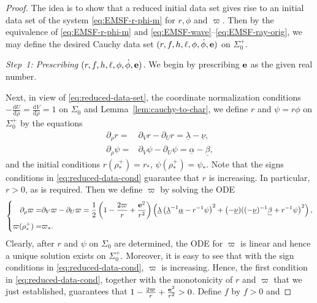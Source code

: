 \documentclass[10pt, reqno]{amsart}
\theoremstyle{definition}
\theoremstyle{remark}
\theoremstyle{conjecture}
\numberwithin{equation}{section}
\newcommand{\ud}{\mathrm{d}}
\newcommand{\rd}{\partial}
\newcommand{\0}{\emptyset}
\newcommand{\alp}{\alpha}
\newcommand{\bt}{\beta}
\newcommand{\lmb}{\lambda}
\newcommand{\Sgm}{\Sigma}
\newcommand{\bfe}{{\bf e}}
\newcommand{\dur}{\nu}
\newcommand{\dvr}{\lmb}
\newcommand{\pfstep}[1]{\vspace{.5em} {\it \noindent #1.}}
\newcommand{\e}{\bfe}							%
\begin{document}
\begin{proof}
The idea is to show that a reduced initial data set gives rise to an initial data set of the system \eqref{eq:EMSF-r-phi-m} for $r, \phi$ and $\varpi$. Then by the equivalence of \eqref{eq:EMSF-r-phi-m} and \eqref{eq:EMSF-wave}--\eqref{eq:EMSF-ray-orig}, we may define the desired Cauchy data set $(r, f, h, \ell, \phi, \dot{\phi}, \e)$ on $\Sgm_{0}^{+}$.

\pfstep{Step~1: Prescribing $(r, f, h, \ell, \phi, \dot{\phi}, \e)$} We begin by prescribing $\e$ as the given real number.


Next, in view of \eqref{eq:reduced-data-set}, the coordinate normalization conditions $- \frac{\ud U}{\ud \rho} = \frac{\ud V}{\ud \rho} = 1$ on $\Sgm_{0}$ and Lemma~\ref{lem:cauchy-to-char}, we define $r$ and $\psi = r \phi$ on $\Sgm_{0}^{+}$ by the equations
\begin{align}
	\rd_{\rho} r
	= & \rd_{V} r - \rd_{U} r = \underline{\dvr} - \underline{\dur} , \label{eq:reduced-data:r}\\
	\rd_{\rho} \psi
	= & \rd_{V} \psi - \rd_{U} \psi = \underline{\alp} - \underline{\bt} \label{eq:reduced-data:psi}, 
\end{align}
and the initial conditions $r(\rho^{+}_{\ast}) = r_{\ast}$, $\psi(\rho^{+}_{\ast}) = \psi_{\ast}$. Note that the signs conditions in \eqref{eq:reduced-data-cond} guarantee that $r$ is increasing. In particular, $r>0$, as is required. Then we define $\varpi$ by solving the ODE
\begin{equation} \label{eq:reduced-data:varpi}
\left\{
\begin{aligned}
	\rd_{\rho} \varpi 
	= & \rd_{V} \varpi - \rd_{U} \varpi 
	=  \frac{1}{2} \left( 1 - \frac{2 \varpi}{r} + \frac{\e^{2}}{r^{2}} \right) \left( \underline{\dvr} \left( \underline{\dvr}^{-1} \underline{\alp} - r^{-1} \psi \right)^{2} + \left(- \underline{\dur}) ((-\underline{\dur} )^{-1} \underline{\bt} + r^{-1} \psi \right)^{2} \right), \\
	\varpi(\rho^{+}_{\ast}) = & \varpi_{\ast}.
\end{aligned}
\right.
\end{equation}
Clearly, after $r$ and $\psi$ on $\Sgm_{0}$ are determined, the ODE for $\varpi$ is linear and hence a unique solution exists on $\Sgm_{0}^{+}$. Moreover, it is easy to see that with the sign conditions in \eqref{eq:reduced-data-cond}, $\varpi$ is increasing. Hence, the first condition in \eqref{eq:reduced-data-cond}, together with the monotonicity of $r$ and $\varpi$ that we just established, guarantees that $1-\frac{2 \varpi}{r} + \frac{\e^{2}}{r^{2}}>0$. Define $f$ by $f> 0$ and

\end{proof}
\end{document}
